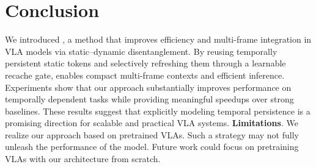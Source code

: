 \section{Conclusion}
We introduced \dysta{}, a method that improves efficiency and multi-frame integration in VLA models via static–dynamic disentanglement. By reusing temporally persistent static tokens and selectively refreshing them through a learnable recache gate, \dysta{} enables compact multi-frame contexts and efficient inference. Experiments show that our approach substantially improves performance on temporally dependent tasks while providing meaningful speedups over strong baselines. These results suggest that explicitly modeling temporal persistence is a promising direction for scalable and practical VLA systems. \noindent\textbf{Limitations}. We realize our approach based on pretrained VLAs. Such a strategy may not fully unleash the performance of the model. Future work could focus on pretraining VLAs with our architecture from scratch.